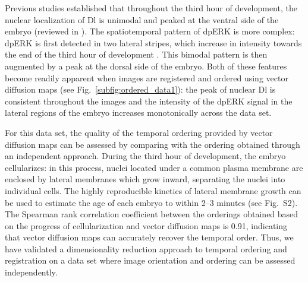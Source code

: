 \documentclass{pnastwo}
\newcommand{\fig}[0]{Fig.}
\begin{document}
\begin{article}

Previous studies established that throughout the third hour of development, the nuclear localization of Dl is unimodal and peaked at the ventral side of the embryo (reviewed in \cite{rushlow2012temporal}).
%
The spatiotemporal pattern of dpERK is more complex: dpERK is first detected in two lateral stripes, which increase in intensity towards the end of the third hour of development \cite{lim2013kinetics}.
%
This bimodal pattern is then augmented by a peak at the dorsal side of the embryo.
%
Both of these features become readily apparent when images are registered and ordered using vector diffusion maps (see \fig~\ref{subfig:ordered_data1}): the peak of nuclear Dl is consistent throughout the images and the intensity of the dpERK signal in the lateral regions of the embryo increases monotonically across the data set.
%

For this data set, the quality of the temporal ordering provided by vector diffusion maps can be assessed by comparing with the ordering obtained through an independent approach.
%
During the third hour of development, the embryo cellularizes: in this process, nuclei located under a common plasma membrane are enclosed by lateral membranes which grow inward, separating the nuclei into individual cells.
%
The highly reproducible kinetics of lateral membrane growth can be used to estimate the age of each embryo to within 2--3 minutes \cite{figard2013plasma} (see \fig~S2).
%
The Spearman rank correlation coefficient between the orderings obtained based on the progress of cellularization and vector diffusion maps is 0.91, indicating that vector diffusion maps can accurately recover the temporal order.
%
Thus, we have validated a dimensionality reduction approach to temporal ordering and registration on a data set where image orientation and ordering can be assessed independently.

%
%



\end{article}
\end{document}
